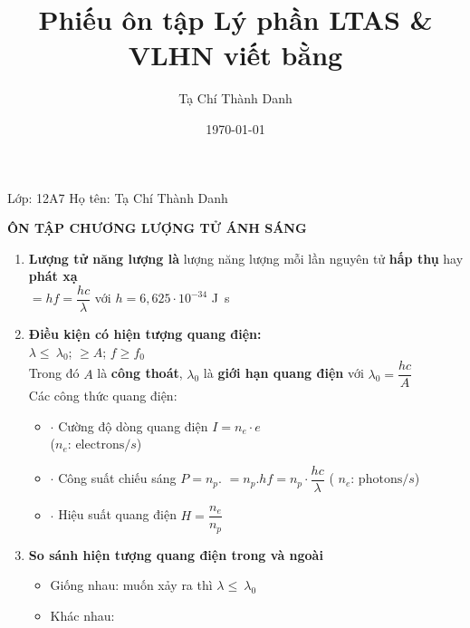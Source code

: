 \documentclass[a4paper,12pt,titlepage,twocolumn]{article}
\title{Phiếu ôn tập Lý phần LTAS \& VLHN viết bằng \textbf{\LaTeXe}}
\date{\today}
\author{Tạ Chí Thành Danh}
\newenvironment{myitemize} 
{ \begin{itemize}[leftmargin=*,label=-]  %
		\setlength{\itemsep}{0pt}
		\setlength{\parskip}{0pt}
		\setlength{\parsep}{0pt}     }
{ \end{itemize}                  }
\newenvironment{myenumerate}
{ \begin{enumerate}[label=\textbf{\arabic*}.]
\setlist{nolistsep} %
\setlength{\itemsep}{0pt}
\setlength{\parskip}{0pt}
\setlength{\parsep}{0pt}	}
{ \end{enumerate}}
\begin{document}
Lớp: 12A7 \quad Họ tên: Tạ Chí Thành Danh \\
\begin{adjustwidth}{-0.2cm}{}
	\begin{center}
		\small\textbf{ÔN TẬP CHƯƠNG LƯỢNG TỬ ÁNH SÁNG}
	\end{center}
\end{adjustwidth}
\begin{myenumerate}
	\item \textbf{Lượng tử năng lượng là} lượng năng lượng mỗi lần nguyên tử \textbf{hấp thụ} hay \textbf{phát xạ} \\
		\textepsilon{} $=hf=\dfrac{hc}{\lambda}$ với $h=6,625 \cdot 10^{-34}$ \si{\joule\second}
	\item \textbf{Điều kiện có hiện tượng quang điện:} \\
	$\lambda \leqslant\ \lambda_0$; \textepsilon{} $\geqslant A$; $f \geqslant f_0$ \\
	Trong đó $A$ là \textbf{công thoát}, $\lambda_0$ là \textbf{giới hạn quang điện} với $\lambda_0 = \dfrac{hc}{A}$ \\
	Các công thức quang điện: 
	\begin{myitemize}
	\item[$\boldsymbol{\cdot}$ ]Cường độ dòng quang điện $I = n_e \cdot e$ \\ ($n_e$: $\mathrm{electrons}/s$)
	\item[$\boldsymbol{\cdot}$ ] Công suất chiếu sáng $P=n_p.$\textepsilon{} $=n_p.hf = n_p \cdot \dfrac{hc}{\lambda}$ ( $n_e$: $\mathrm{photons}/s$)
	\item[$\boldsymbol{\cdot}$ ] Hiệu suất quang điện $H = \dfrac{n_e}{n_p}$
	\end{myitemize}
	\item \textbf{So sánh hiện tượng quang điện trong và ngoài}
	\begin{myitemize}
		\item Giống nhau: muốn xảy ra thì $\lambda \leqslant\ \lambda_0$
		\item Khác nhau:
	\end{myitemize}
	\begin{adjustwidth}{-1cm}{}
	\renewcommand{\arraystretch}{0} 

\end{adjustwidth}
\end{myenumerate}
\end{document}
